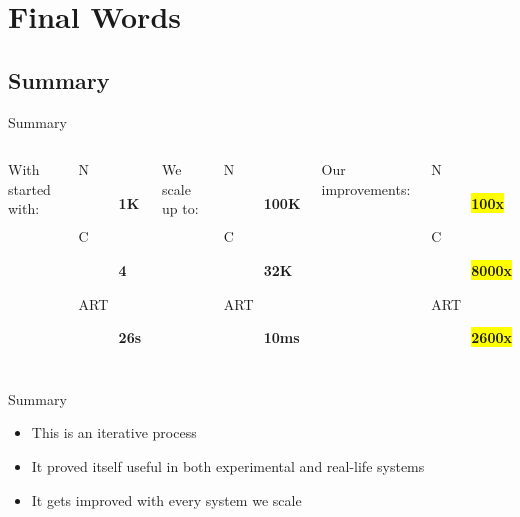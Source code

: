 \documentclass[utf8]{beamer}
\begin{document}
\section{Final Words}
\subsection{Summary}
\begin{frame}{Summary}
	\begin{columns}
			With started with:
			\begin{description}
				\item[N] \textbf{\Large 1K}
				\item[C] \textbf{\Large 4}
				\item[ART] \textbf{\Large 26s}
			\end{description}
			We scale up to:
			\begin{description}
				\item[N] \textbf{\Large 100K}
				\item[C] \textbf{\Large 32K}
				\item[ART] \textbf{\Large 10ms}
			\end{description}
			Our improvements:
			\begin{description}
				\item[N] \textbf{\colorbox{yellow}{100x}}
				\item[C] \textbf{\colorbox{yellow}{8000x}}
				\item[ART] \textbf{\colorbox{yellow}{2600x}}
			\end{description}
	\end{columns}
\end{frame}
\begin{frame}{Summary}
	\begin{itemize}
		\item<+-> This is an \alert{iterative} process
		\item<+-> It proved itself useful in both experimental and real-life systems
		\item<+-> It gets improved with every system we scale
	\end{itemize}
\end{frame}
\end{document}
